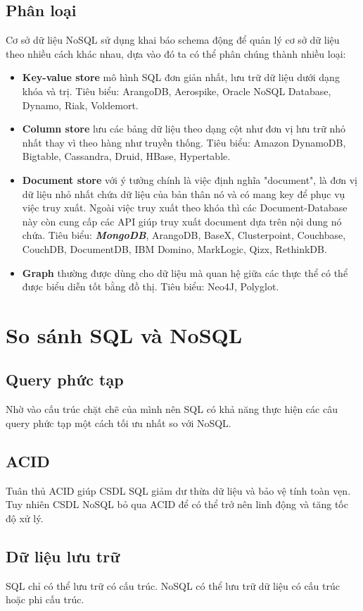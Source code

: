 \subsection{Phân loại}
Cơ sở dữ liệu NoSQL sử dụng khai báo schema động để quản lý cơ sở dữ liệu theo nhiều cách khác nhau, dựa vào đó ta có thể phân chúng thành nhiều loại:
\begin{itemize}
\item \textbf{Key-value store} mô hình SQL đơn giản nhất, lưu trữ dữ liệu dưới dạng khóa và trị. Tiêu biểu: ArangoDB, Aerospike, Oracle NoSQL Database, Dynamo, Riak, Voldemort.
\item \textbf{Column store} lưu các bảng dữ liệu theo dạng cột như đơn vị lưu trữ nhỏ nhất thay vì theo hàng như truyền thống. Tiêu biểu: Amazon DynamoDB, Bigtable, Cassandra, Druid, HBase, Hypertable.
\item \textbf{Document store} với ý tưởng chính là việc định nghĩa "document", là đơn vị dữ liệu nhỏ nhất chứa dữ liệu của bản thân nó và có mang key để phục vụ việc truy xuất. Ngoài việc truy xuất theo khóa thì các Document-Database này còn cung cấp các API giúp truy xuất document dựa trên nội dung nó chứa. Tiêu biểu: \textbf{\textit{MongoDB}}, ArangoDB, BaseX, Clusterpoint, Couchbase, CouchDB, DocumentDB, IBM Domino, MarkLogic, Qizx, RethinkDB.
\item \textbf{Graph} thường được dùng cho dữ liệu mà quan hệ giữa các thực thể có thể được biểu diễn tốt bằng đồ thị. Tiêu biểu: Neo4J, Polyglot.
\end{itemize}
\section{So sánh SQL và NoSQL}
\subsection{Query phức tạp}
Nhờ vào cấu trúc chặt chẽ của mình nên SQL có khả năng thực hiện các câu query phức tạp một cách tối ưu nhất so với NoSQL.
\subsection{ACID}
Tuân thủ ACID giúp CSDL SQL giảm dư thừa dữ liệu và bảo vệ tính toàn vẹn. Tuy nhiên CSDL NoSQL bỏ qua ACID để có thể trở nên linh động và tăng tốc độ xử lý.
\subsection{Dữ liệu lưu trữ}
SQL chỉ có thể lưu trữ có cấu trúc. NoSQL có thể lưu trữ dữ liệu có cấu trúc hoặc phi cấu trúc.

